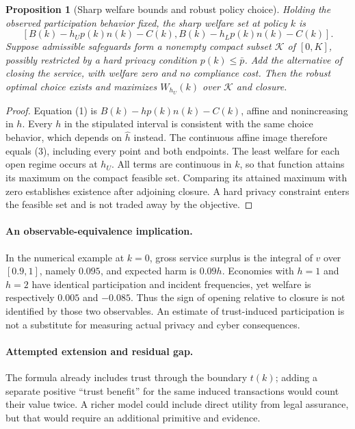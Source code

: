 \documentclass[11pt]{article}
\newtheorem{proposition}[theorem]{Proposition}
\theoremstyle{definition}
\begin{document}
\begin{proposition}[Sharp welfare bounds and robust policy choice]
Holding the observed participation behavior fixed, the sharp welfare set at policy $k$ is
\[
 [B(k)-h_Up(k)n(k)-C(k),
   B(k)-h_Lp(k)n(k)-C(k)].
 \tag{3}
\]
Suppose admissible safeguards form a nonempty compact subset $\mathcal K$ of $[0,K]$, possibly restricted by a hard privacy condition $p(k)\leq\bar p$. Add the alternative of closing the service, with welfare zero and no compliance cost. Then the robust optimal choice exists and maximizes $W_{h_U}(k)$ over $\mathcal K$ and closure.
\end{proposition}
\begin{proof}
Equation (1) is $B(k)-hp(k)n(k)-C(k)$, affine and nonincreasing in $h$. Every $h$ in the stipulated interval is consistent with the same choice behavior, which depends on $\widehat h$ instead. The continuous affine image therefore equals (3), including every point and both endpoints. The least welfare for each open regime occurs at $h_U$. All terms are continuous in $k$, so that function attains its maximum on the compact feasible set. Comparing its attained maximum with zero establishes existence after adjoining closure. A hard privacy constraint enters the feasible set and is not traded away by the objective.
\end{proof}

\paragraph{An observable-equivalence implication.}
In the numerical example at $k=0$, gross service surplus is the integral of $v$ over $[0.9,1]$, namely $0.095$, and expected harm is $0.09h$. Economies with $h=1$ and $h=2$ have identical participation and incident frequencies, yet welfare is respectively $0.005$ and $-0.085$. Thus the sign of opening relative to closure is not identified by those two observables. An estimate of trust-induced participation is not a substitute for measuring actual privacy and cyber consequences.

\paragraph{Attempted extension and residual gap.}
The formula already includes trust through the boundary $t(k)$; adding a separate positive ``trust benefit'' for the same induced transactions would count their value twice. A richer model could include direct utility from legal assurance, but that would require an additional primitive and evidence.
\end{document}
